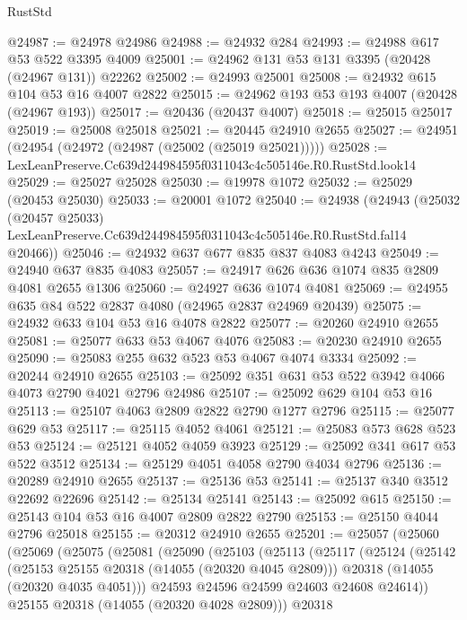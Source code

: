 \begin{lexlean}{RustStd}
\begin{coremodule}
@24987 := @24978 @24986
@24988 := @24932 @284
@24993 := @24988 @617 @53 @522 @3395 @4009
@25001 := @24962 @131 @53 @131 @3395 (@20428 (@24967 @131)) @22262
@25002 := @24993 @25001
@25008 := @24932 @615 @104 @53 @16 @4007 @2822
@25015 := @24962 @193 @53 @193 @4007 (@20428 (@24967 @193))
@25017 := @20436 (@20437 @4007)
@25018 := @25015 @25017
@25019 := @25008 @25018
@25021 := @20445 @24910 @2655
@25027 := @24951 (@24954 (@24972 (@24987 (@25002 (@25019 @25021)))))
@25028 := LexLeanPreserve.Cc639d244984595f0311043c4c505146e.R0.RustStd.look14
@25029 := @25027 @25028
@25030 := @19978 @1072
@25032 := @25029 (@20453 @25030)
@25033 := @20001 @1072
@25040 := @24938
    (@24943
      (@25032
        (@20457 @25033)
        LexLeanPreserve.Cc639d244984595f0311043c4c505146e.R0.RustStd.fal14
        @20466))
@25046 := @24932 @637 @677 @835 @837 @4083 @4243
@25049 := @24940 @637 @835 @4083
@25057 := @24917 @626 @636 @1074 @835 @2809 @4081 @2655 @1306
@25060 := @24927 @636 @1074 @4081
@25069 := @24955 @635 @84 @522 @2837 @4080 (@24965 @2837 @24969 @20439)
@25075 := @24932 @633 @104 @53 @16 @4078 @2822
@25077 := @20260 @24910 @2655
@25081 := @25077 @633 @53 @4067 @4076
@25083 := @20230 @24910 @2655
@25090 := @25083 @255 @632 @523 @53 @4067 @4074 @3334
@25092 := @20244 @24910 @2655
@25103 := @25092 @351 @631 @53 @522 @3942 @4066 @4073 @2790 @4021 @2796 @24986
@25107 := @25092 @629 @104 @53 @16
@25113 := @25107 @4063 @2809 @2822 @2790 @1277 @2796
@25115 := @25077 @629 @53
@25117 := @25115 @4052 @4061
@25121 := @25083 @573 @628 @523 @53
@25124 := @25121 @4052 @4059 @3923
@25129 := @25092 @341 @617 @53 @522 @3512
@25134 := @25129 @4051 @4058 @2790 @4034 @2796
@25136 := @20289 @24910 @2655
@25137 := @25136 @53
@25141 := @25137 @340 @3512 @22692 @22696
@25142 := @25134 @25141
@25143 := @25092 @615
@25150 := @25143 @104 @53 @16 @4007 @2809 @2822 @2790
@25153 := @25150 @4044 @2796 @25018
@25155 := @20312 @24910 @2655
@25201 := @25057
    (@25060
      (@25069
        (@25075
          (@25081
            (@25090
              (@25103
                (@25113
                  (@25117
                    (@25124
                      (@25142
                        (@25153 @25155 @20318 (@14055 (@20320 @4045 @2809)))
                        @20318
                        (@14055 (@20320 @4035 @4051)))
                      @24593
                      @24596
                      @24599
                      @24603
                      @24608
                      @24614))
                  @25155
                  @20318
                  (@14055 (@20320 @4028 @2809)))
                @20318

\end{coremodule}
\end{lexlean}
